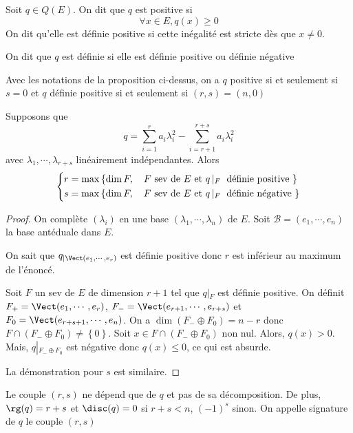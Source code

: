 \begin{dfn}
    Soit $q \in  Q(E)$. On dit que $q$ est positive si \[
        \forall  x \in  E, q(x)\geq 0
    \] 
    On dit qu'elle est définie positive si cette inégalité est stricte dès que $x\neq 0$.

    On dit que $q$ est définie si elle est définie positive ou définie négative
\end{dfn}

\begin{rem}
    Avec les notations de la proposition ci-dessus, on a $q$ positive  si et seulement si $s=0$ et  $q$ définie positive  si et seulement si $(r, s)=(n, 0)$
\end{rem}

\begin{thm}
Supposons que \[
    q=\sum_{i=1}^r a_i \lambda_i^2 -\sum_{i=r+1}^{r+s}a_i \lambda_i^2 
\] 
avec $ \lambda_1, \cdots , \lambda_{r+s}$ linéairement indépendantes. Alors \[
    \begin{dcases}
r=\max \left\{ \dim F, \quad  F \text{ sev  de }  E \text{ et } q\left|_{F}\right. \text{ définie positive }\right\} \\
s=\max \left\{ \dim F, \quad  F \text{ sev  de }  E \text{ et } q\left|_{F}\right. \text{ définie négative }\right\} 
    \end{dcases}
\] 
\end{thm}

\begin{proof}
    On complète $(\lambda_i)$ en une base $(\lambda_1, \cdots , \lambda_n)$ de $E$. Soit  $\mathcal  B=(e_1, \cdots , e_n)$ la base antéduale dans $E$.
    
    On sait que $q_{|\Vect(e_1, \cdots , e_r)}$ est définie positive donc $r$ est inférieur au maximum de l'énoncé.

Soit $F$ un sev de $E$ de dimension $r+1$ tel que $q \left|_{F}\right.$ est définie positive. On définit $F_+=\Vect(e_1, \cdots , e_r)$, $F_-=\Vect(e_{r+1}, \cdots , e_{r+s})$ et $F_0=\Vect(e_{r+s+1}, \cdots , e_n)$. On a $\dim(F_-\oplus F_0)=n-r$ donc $F\cap (F_-\oplus F_0)\neq \left\{ 0 \right\} $. Soit $x \in  F\cap (F_-\oplus F_0)$ non nul. Alors, $q(x)>0$. Mais, $q\left|_{F_-\oplus F_0}\right.$ est négative donc $q(x)\leq 0$, ce qui est absurde.

La démonstration pour $s$ est similaire.
\end{proof}

\begin{thm}
    Le couple $(r, s)$ ne dépend que de  $q$ et pas de sa décomposition. De plus,  $\rg(q)=r+s$ et  $\disc(q)=0$ si  $r+s<n$,  $(-1)^s$ sinon. On appelle signature de $q$ le couple  $(r, s)$
\end{thm}

